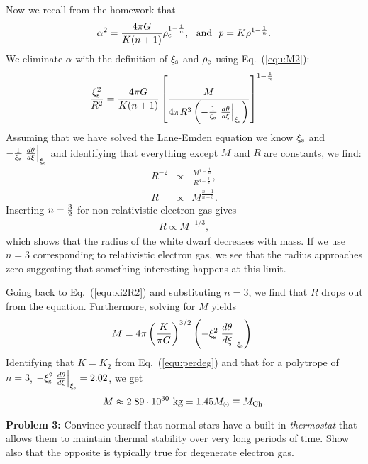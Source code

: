 \documentclass[12pt]{article}
\def\rhoc{\textcolor{red}{\rho}}
\def\xis{\xi_{\rm s}}
\def\rhoc{\rho_{\rm c}}
\def\threehalfs{{\textstyle{3\over2}}}
\begin{document}
Now we recall from the homework that
\begin{equation}
\alpha^2 = \frac{4\pi G}{K(n+1)} \rhoc^{1-\frac{1}{n}}, \ \ \mbox{and}\ \ p = K\rho^{1-\frac{1}{n}}.
\end{equation}
We eliminate $\alpha$ with the definition of $\xis$ and $\rhoc$ using
Eq.~(\ref{equ:M2}):
\begin{equation}
\frac{\xis^2}{R^2} = \frac{4\pi G}{K(n+1)} \left[ \frac{M}{4\pi R^3 \left(-\frac{1}{\xis} \left.\frac{d\theta}{d\xi}\right|_{\xis} \right)}  \right]^{1-\frac{1}{n}}.\label{equ:xi2R2}
\end{equation}
Assuming that we have solved the Lane-Emden equation we know $\xis$
and $-\frac{1}{\xis} \left.\frac{d\theta}{d\xi}\right|_{\xis}$ and
identifying that everything except $M$ and $R$ are constants, we find:
\begin{eqnarray}
R^{-2} &\propto& \frac{M^{1-\frac{1}{n}}}{R^{3-\frac{3}{n}}}, \nonumber \\
R      &\propto& M^{\frac{n-1}{n-3}}.
\end{eqnarray}
Inserting $n=\threehalfs$ for non-relativistic electron gas gives
\begin{eqnarray}
R \propto M^{-1/3},
\end{eqnarray}
which shows that the radius of the white dwarf decreases with mass.
If we use $n=3$ corresponding to relativistic electron gas, we see
that the radius approaches zero suggesting that something interesting
happens at this limit.

Going back to Eq.~(\ref{equ:xi2R2}) and substituting $n=3$, we find
that $R$ drops out from the equation. Furthermore, solving for $M$
yields
\begin{equation}
M = 4\pi \left(\frac{K}{\pi G}\right)^{3/2} \left( - \xis^2 \left.\frac{d\theta}{d\xi}\right|_{\xis} \right).
\end{equation}
Identifying that $K=K_2$ from Eq.~(\ref{equ:perdeg}) and that for a
polytrope of $n=3$, $-\xis^2 \left.\frac{d\theta}{d\xi}\right|_{\xis}
= 2.02$, we get
\begin{equation}
M \approx 2.89\cdot 10^{30}~\mbox{kg} = 1.45M_\odot \equiv M_{\rm Ch}.
\end{equation}


{\bf Problem 3:} Convince yourself that normal stars have a built-in
\emph{thermostat} that allows them to maintain thermal stability over
very long periods of time. Show also that the opposite is typically
true for degenerate electron gas.
\end{document}
